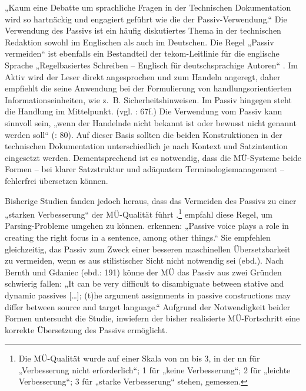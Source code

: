„Kaum eine Debatte um sprachliche Fragen in der Technischen Dokumentation wird so hartnäckig und engagiert geführt wie die der Passiv-Verwendung.“ \citep{Muthig2003} Die Verwendung des Passivs ist ein häufig diskutiertes Thema in der technischen Redaktion sowohl im Englischen als auch im Deutschen. Die Regel „Passiv vermeiden“ ist ebenfalls ein Bestandteil der tekom-Leitlinie für die englische Sprache „Regelbasiertes Schreiben -- Englisch für deutschsprachige Autoren“ \citep{Siegel2014}. Im Aktiv wird der Leser direkt angesprochen und zum Handeln angeregt, daher empfiehlt die \citet[81]{tekom2013} seine Anwendung bei der Formulierung von handlungsorientierten Informationseinheiten, wie z.~B. Sicherheitshinweisen. Im Passiv hingegen steht die Handlung im Mittelpunkt. (vgl. \citealt{BaumertVerhein-Jarren2012}: 67f.) Die Verwendung vom Passiv kann sinnvoll sein, „wenn der Handelnde nicht bekannt ist oder bewusst nicht genannt werden soll“ (\citealt{tekom2013}: 80). Auf dieser Basis sollten die beiden Konstruktionen in der technischen Dokumentation unterschiedlich je nach Kontext und Satzintention eingesetzt werden. Dementsprechend ist es notwendig, dass die MÜ-Systeme beide Formen -- bei klarer Satzstruktur und adäquatem Terminologiemanagement -- fehlerfrei übersetzen können.

Bisherige Studien fanden jedoch heraus, dass das Vermeiden des Passivs zu einer „starken Verbesserung“ der MÜ-Qualität führt \citep{Siegel2013}.\footnote{{{{Die MÜ-Qualität wurde auf einer Skala von nn bis 3, in der nn für „Verbesserung nicht erforderlich“; 1 für „keine Verbesserung“; 2 für „leichte Verbesserung“; 3 für „starke Verbesserung“ stehen, gemessen.}}}} \citet{Reuther2003} empfahl diese Regel, um Parsing-Probleme umgehen zu können. \citet[190]{BernthGdaniec2001} erkennen: „Passive voice plays a role in creating the right focus in a sentence, among other things.“ Sie empfehlen gleichzeitig, das Passiv zum Zweck einer besseren maschinellen Übersetzbarkeit zu vermeiden, wenn es aus stilistischer Sicht nicht notwendig sei (ebd.). Nach Bernth und Gdaniec (ebd.: 191) könne der MÜ das Passiv aus zwei Gründen schwierig fallen: „It can be very difficult to disambiguate between stative and dynamic passives […]; (t)he argument assignments in passive constructions may differ between source and target language.“ Aufgrund der Notwendigkeit beider Formen untersucht die Studie, inwiefern der bisher realisierte MÜ-Fortschritt eine korrekte Übersetzung des Passivs ermöglicht.

